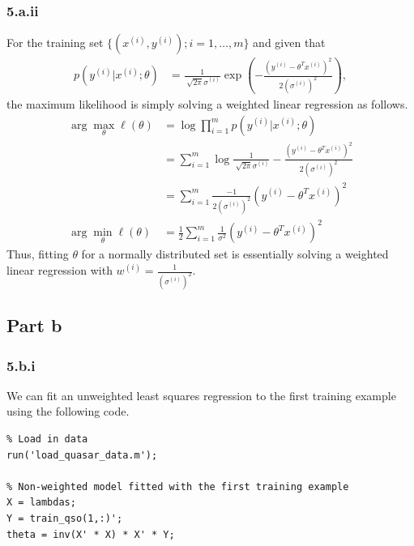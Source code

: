 \documentclass[11pt,a4paper,titlepage]{article}
\begin{document}
{{\subsubsection*{5.a.ii}{
For the training set $\{(x^{(i)},y^{(i)});i=1,\ldots,m\}$ and given that 
\begin{align*}
	p(y^{(i)}|x^{(i)};\theta) &= \frac{1}{\sqrt[]{2\pi}\sigma^{(i)}} \exp(-\frac{(y^{(i)}-\theta^Tx^{(i)})^2}{2(\sigma^{(i)})^2}),
\end{align*}
the maximum likelihood is simply solving a weighted linear regression as follows.
\begin{align*}
	\arg\max_\theta \ell(\theta) &= \log \prod_{i=1}^m p(y^{(i)}|x^{(i)};\theta)
    \\&= \sum_{i=1}^m \log \frac{1}{\sqrt[]{2\pi}\sigma^{(i)}} - \frac{(y^{(i)}-\theta^Tx^{(i)})^2}{2(\sigma^{(i)})^2}
    \\&= \sum_{i=1}^m \frac{-1}{2(\sigma^{(i)})^2} (y^{(i)}-\theta^Tx^{(i)})^2
  \\ \arg \min_\theta \ell(\theta) &= \frac{1}{2} \sum_{i=1}^m \frac{1}{\sigma^2} (y^{(i)}-\theta^Tx^{(i)})^2
\end{align*}
Thus, fitting $\theta$ for a normally distributed set is essentially solving a weighted linear regression with $w^{(i)} = \frac{1}{(\sigma^{(i)})^2}$.
}\label{prob:5a3}
}\label{prob:5a}
\subsection*{Part b}{
\subsubsection*{5.b.i}{
We can fit an unweighted least squares regression to the first training example using the following code.
\begin{lstlisting}
% Load in data
run('load_quasar_data.m');

% Non-weighted model fitted with the first training example
X = lambdas;
Y = train_qso(1,:)';
theta = inv(X' * X) * X' * Y;


\end{lstlisting}}}}
\end{document}
